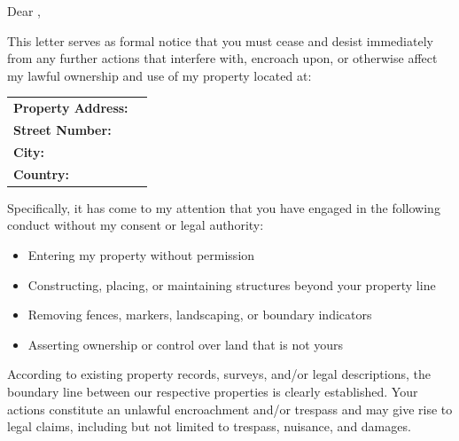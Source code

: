 
Dear \recipientName{},

This letter serves as formal notice that you must cease and desist immediately from any further actions that interfere with, encroach upon, or otherwise affect my lawful ownership and use of my property located at:

\noindent
\begin{tabular}{p{6cm} p{10cm}}
\textbf{Property Address:} & \PropertyAddress{} \\ 
\textbf{Street Number:} & \PropertyStreet{} \\ 
\textbf{City:} & \PropertyCity{} \\ 
\textbf{Country:} & \PropertyCountry{}\\ 
\end{tabular}

Specifically, it has come to my attention that you have engaged in the following conduct without my consent or legal authority:

\begin{itemize}
  \item Entering my property without permission
  \item Constructing, placing, or maintaining structures beyond your property line
  \item Removing fences, markers, landscaping, or boundary indicators
  \item Asserting ownership or control over land that is not yours
\end{itemize}

According to existing property records, surveys, and/or legal descriptions, the boundary line between our respective properties is clearly established. Your actions constitute an unlawful encroachment and/or trespass and may give rise to legal claims, including but not limited to trespass, nuisance, and damages.

